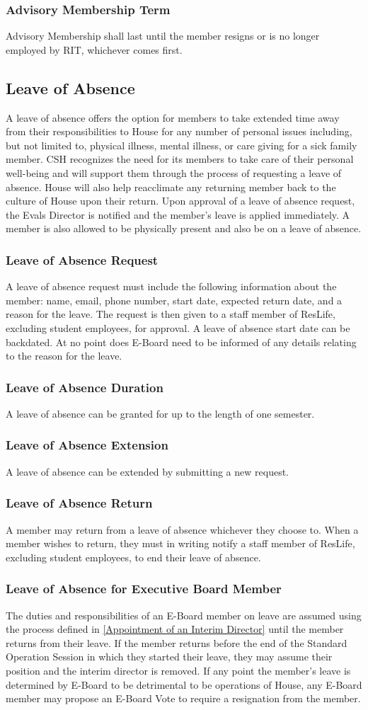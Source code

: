 \documentclass{article}
\newcommand{\asection}[1]{\subsection{#1} \label{#1}}
\newcommand{\asubsection}[1]{\subsubsection{#1} \label{#1}}
\begin{document}
\asubsection{Advisory Membership Term}
Advisory Membership shall last until the member resigns or is no longer employed by RIT, whichever comes first.

\asection{Leave of Absence}
A leave of absence offers the option for members to take extended time away from their responsibilities to House for any number of personal issues including, but not limited to, physical illness, mental illness, or care giving for a sick family member.
CSH recognizes the need for its members to take care of their personal well-being and will support them through the process of requesting a leave of absence.
House will also help reacclimate any returning member back to the culture of House upon their return.
Upon approval of a leave of absence request, the Evals Director is notified and the member's leave is applied immediately.
A member is also allowed to be physically present and also be on a leave of absence.

\asubsection{Leave of Absence Request}
A leave of absence request must include the following information about the member: name, email, phone number, start date, expected return date, and a reason for the leave.
The request is then given to a staff member of ResLife, excluding student employees, for approval.
A leave of absence start date can be backdated.
At no point does E-Board need to be informed of any details relating to the reason for the leave.

\asubsection{Leave of Absence Duration}
A leave of absence can be granted for up to the length of one semester.

\asubsection{Leave of Absence Extension}
A leave of absence can be extended by submitting a new request.

\asubsection{Leave of Absence Return}
A member may return from a leave of absence whichever they choose to.
When a member wishes to return, they must in writing notify a staff member of ResLife, excluding student employees, to end their leave of absence.

\asubsection{Leave of Absence for Executive Board Member}
The duties and responsibilities of an E-Board member on leave are assumed using the process defined in \ref{Appointment of an Interim Director} until the member returns from their leave.
If the member returns before the end of the Standard Operation Session in which they started their leave, they may assume their position and the interim director is removed. %
If any point the member's leave is determined by E-Board to be detrimental to be operations of House, any E-Board member may propose an E-Board Vote to require a resignation from the member.
\end{document}
